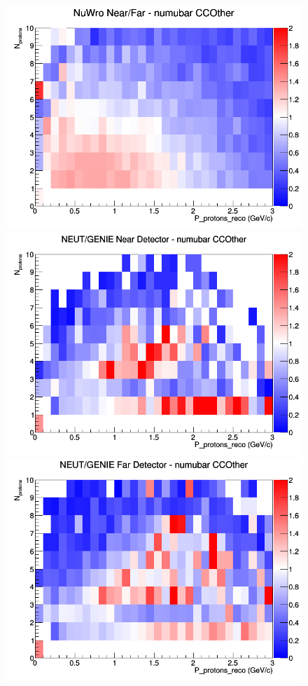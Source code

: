 \begin{figure}[h]
\endminipage
{}
\includegraphics[width=\linewidth]{eff_N_P/LAr/protons/ratios/CCOther_NuWro_numubar_NF_N_P.png}
\endminipage
\newline
{}
\includegraphics[width=\linewidth]{eff_N_P/LAr/protons/ratios/CCOther_NEUT_GENIE_numubar_near_N_P.png}
\endminipage
{}
\includegraphics[width=\linewidth]{eff_N_P/LAr/protons/ratios/CCOther_NEUT_GENIE_numubar_far_N_P.png}

\end{figure}
